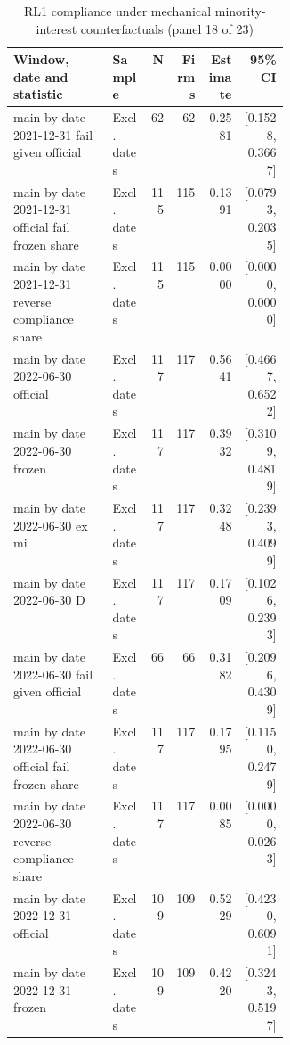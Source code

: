 \begin{table}[!htbp]\centering\scriptsize
\caption{RL1 compliance under mechanical minority-interest counterfactuals (panel 18 of 23)}
\begin{threeparttable}
\begin{tabular}{p{0.36\linewidth}lrrrr}
\toprule
Window, date and statistic & Sample & N & Firms & Estimate & 95\% CI \\
\midrule
main by date 2021-12-31 fail given official & Excl. dates & 62 & 62 & 0.2581 & [0.1528, 0.3667] \\
main by date 2021-12-31 official fail frozen share & Excl. dates & 115 & 115 & 0.1391 & [0.0793, 0.2035] \\
main by date 2021-12-31 reverse compliance share & Excl. dates & 115 & 115 & 0.0000 & [0.0000, 0.0000] \\
main by date 2022-06-30 official & Excl. dates & 117 & 117 & 0.5641 & [0.4667, 0.6522] \\
main by date 2022-06-30 frozen & Excl. dates & 117 & 117 & 0.3932 & [0.3109, 0.4819] \\
main by date 2022-06-30 ex mi & Excl. dates & 117 & 117 & 0.3248 & [0.2393, 0.4099] \\
main by date 2022-06-30 D & Excl. dates & 117 & 117 & 0.1709 & [0.1026, 0.2393] \\
main by date 2022-06-30 fail given official & Excl. dates & 66 & 66 & 0.3182 & [0.2096, 0.4309] \\
main by date 2022-06-30 official fail frozen share & Excl. dates & 117 & 117 & 0.1795 & [0.1150, 0.2479] \\
main by date 2022-06-30 reverse compliance share & Excl. dates & 117 & 117 & 0.0085 & [0.0000, 0.0263] \\
main by date 2022-12-31 official & Excl. dates & 109 & 109 & 0.5229 & [0.4230, 0.6091] \\
main by date 2022-12-31 frozen & Excl. dates & 109 & 109 & 0.4220 & [0.3243, 0.5197] \\
\bottomrule
\end{tabular}
\begin{tablenotes}[flushleft]\footnotesize

\end{tablenotes}
\end{threeparttable}
\end{table}
